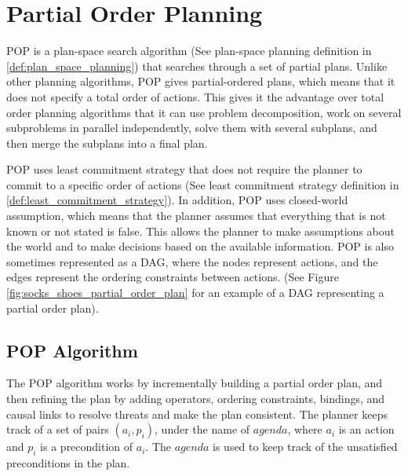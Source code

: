 \section{Partial Order Planning}
\acf{POP} is a plan-space search algorithm (See plan-space planning definition in \ref{def:plan_space_planning}) that searches through a set of partial plans.
Unlike other planning algorithms, \ac{POP} gives partial-ordered plans, which means that it does not specify a total order of actions.
This gives it the advantage over total order planning algorithms that it can use problem decomposition, work
on several subproblems in parallel independently, solve them with several subplans, and then merge the subplans into a final plan.


\ac{POP} uses least commitment strategy that does not require the planner to commit to a specific order of actions (See least commitment strategy definition in \ref{def:least_commitment_strategy}). In addition, \ac{POP} uses closed-world assumption, which means that the planner assumes that everything that is not known or not stated is false. This allows the planner to make assumptions about the world and to make decisions based on the available information.
\ac{POP} is also sometimes represented as a \acf{DAG}, where the nodes represent actions, and the edges represent the ordering constraints between actions. (See Figure \ref{fig:socks_shoes_partial_order_plan} for an example of a \ac{DAG} representing a partial order plan).

\subsection{POP Algorithm}
The \acf{POP} algorithm works by incrementally building a partial order plan, and then refining the plan by adding operators, ordering constraints,
bindings, and causal links to resolve threats and make the plan consistent.
The planner keeps track of a set of pairs $(a_i, p_i)$, under the name of $agenda$, where $a_i$ is an action and $p_i$ is a precondition of $a_i$. The $agenda$ is used to keep track of the unsatisfied preconditions in the plan.


